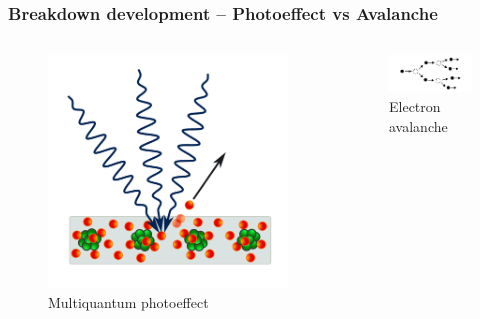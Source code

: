 \documentclass{beamer}
\begin{document}
	
	\begin{frame}
		\frametitle{Breakdown development -- Photoeffect vs Avalanche}
		
		\begin{columns}
			\begin{figure}
				\centering
				\includegraphics[width=0.9\linewidth]{res/multiphoton.png}
				\caption*{Multiquantum photoeffect}
			\end{figure}
			
			\begin{figure}
				\centering
				\includegraphics[width=0.9\linewidth]{res/electron_avalanche.png}
				\caption*{Electron avalanche}
			\end{figure}
		\end{columns}
		

\end{frame}
\end{document}
